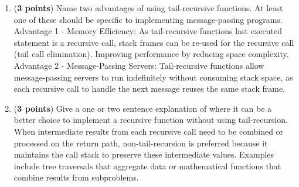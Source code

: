 \documentclass{article}
\newenvironment{answer}
{\color{blue}}
{\normalfont}
\begin{document}
\begin{enumerate}
\begin{enumerate}
	Is the function  in Figure~\ref{fig:hw2-fun} tail-recursive?
	Give a one-sentence justification for your answer. \\
    \begin{answer}
      Yes, as the final statement executed by the function is a recursive call.
    \end{answer}
      \item (\textbf{3 points})
	Name two advantages of using tail-recursive functions.
	At least one of these should be specific to implementing message-passing programs. \\
      \begin{answer}
      Advantage 1 - Memory Efficiency: As tail-recursive functions last executed statement is a recursive call,
      stack frames can be re-used for the recursive call (tail call elimination). Improving performance by reducing space complexity.
      \\
      Advantage 2 - Message-Passing Servers: Tail-recursive functions allow message-passing servers to run indefinitely without consuming stack space, as each recursive call to handle the next message reuses the same stack frame.
      \end{answer}
      \item (\textbf{3 points})
	Give a one or two sentence explanation of where it can be a better choice to implement
	a recursive function without using tail-recursion. \\
      \begin{answer}
        When intermediate results from each recursive call need to be combined or processed on the return path, non-tail-recursion is preferred because it maintains the call stack to preserve these intermediate values. Examples include tree traversals that aggregate data or mathematical functions that combine results from subproblems.
      \end{answer}

    \end{enumerate}


\end{enumerate}
\end{document}
